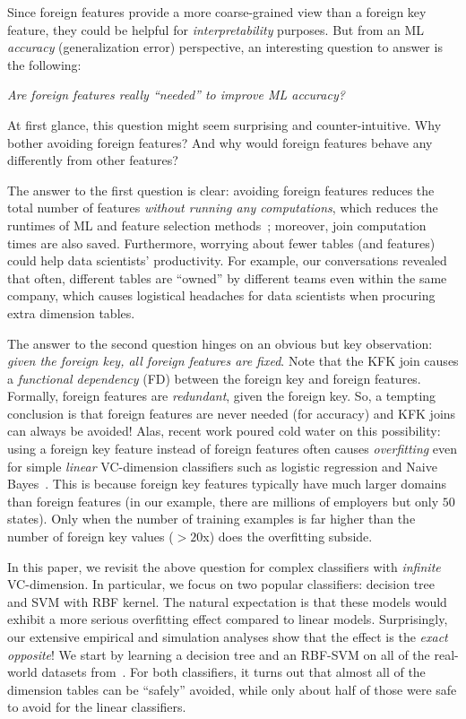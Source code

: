 \documentclass[sigconf]{acmart}
\begin{document}
Since foreign features provide a more coarse-grained view than a foreign key feature, they could be helpful for \textit{interpretability} purposes. 
But from an ML \textit{accuracy} (generalization error) perspective, an interesting question to answer is the following: 

\begin{center}\textit{Are foreign features really ``needed'' to improve ML accuracy?}\end{center}

At first glance, this question might seem surprising and counter-intuitive. Why bother avoiding foreign features? And why would foreign features behave any differently from other features? 

The answer to the first question is clear: avoiding foreign features reduces the total number of features \textit{without running any computations}, 
which reduces the runtimes of ML and feature selection methods~\cite{guyon}; moreover, join computation times are also saved. 
Furthermore, worrying about fewer tables (and features) could help data scientists' productivity. For example, our conversations revealed that often, different tables 
are ``owned'' by different teams even within the same company, which causes logistical headaches for data scientists when procuring extra dimension tables.

The answer to the second question hinges on an obvious but key observation: \textit{given the foreign key, all foreign features are fixed}. 
Note that the KFK join causes a \textit{functional dependency} (FD) between the foreign key and foreign features. 
Formally, foreign features are \textit{redundant}, given the foreign key. 
So, a tempting conclusion is that foreign features are never needed (for accuracy) and KFK joins can always be avoided! Alas, recent work poured cold water
on this possibility: using a foreign key feature instead of foreign features often causes \textit{overfitting} even for simple \textit{linear} VC-dimension classifiers such as 
logistic regression and Naive Bayes~\cite{hamlet}. This is because foreign key features typically have much larger domains than foreign features (in our example, 
there are millions of employers but only $50$ states). Only when the number of training examples is far higher than the number of foreign key values ($>20$x) does the overfitting subside.

In this paper, we revisit the above question for complex classifiers with \textit{infinite} VC-dimension. In particular, we focus on two popular classifiers: 
decision tree and SVM with RBF kernel. The natural expectation is that these models would exhibit a more serious overfitting effect compared to linear models. 
Surprisingly, our extensive empirical and simulation analyses show that the effect is the \textit{exact opposite}! We start by learning a decision tree and an RBF-SVM
on all of the real-world datasets from~\cite{hamlet}. For both classifiers, it turns out that almost all of the dimension tables can be ``safely'' avoided, while only 
about half of those were safe to avoid for the linear classifiers.
\end{document}
